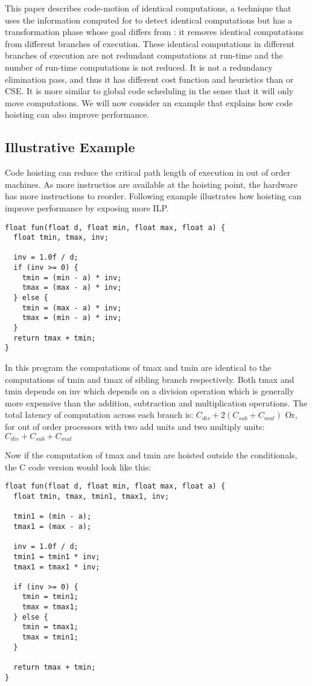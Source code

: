 \documentclass[acmlarge,review]{acmart}\settopmatter{printfolios=true}
\begin{document}
This paper describes code-motion of identical computations, a technique that
uses the information computed for \PRE{} to detect identical computations but
has a transformation phase whose goal differs from \PRE{}: it removes identical
computations from different branches of execution.  These identical computations
in different branches of execution are not redundant computations at run-time
and the number of run-time computations is not reduced. It is not a redundancy
elimination pass, and thus it has different cost function and heuristics than
\PRE{} or CSE. It is more similar to global code scheduling
\cite{dragonbook,click1995global} in the sense that it will only move
computations. We will now consider an example that explains how code hoisting can
also improve performance.

\subsection{Illustrative Example}
\label{subsec:example}
Code hoisting can reduce the critical path length of execution in out of
order machines. As more instructios are available at the hoisting point, the
hardware has more instructions to reorder. Following example illustrates how
hoisting can improve performance by exposing more ILP.

\begin{verbatim}
float fun(float d, float min, float max, float a) {
  float tmin, tmax, inv;

  inv = 1.0f / d;
  if (inv >= 0) {
    tmin = (min - a) * inv;
    tmax = (max - a) * inv;
  } else {
    tmin = (max - a) * inv;
    tmax = (min - a) * inv;
  }
  return tmax + tmin;
}
\end{verbatim}

In this program the computations of tmax and tmin are identical to the
computations of tmin and tmax of sibling branch respectively. Both tmax and tmin
depends on inv which depends on a division operation which is generally more
expensive than the addition, subtraction and multiplication operations. The
total latency of computation across each branch is:
$C_{div} + 2(C_{sub} + C_{mul})$
Or, for out of order processors with two add units and two multiply units:
$C_{div} + C_{sub} + C_{mul}$

Now if the computation of tmax and tmin are hoisted outside the
conditionals, the C code version would look like this:
\begin{verbatim}
float fun(float d, float min, float max, float a) {
  float tmin, tmax, tmin1, tmax1, inv;

  tmin1 = (min - a);
  tmax1 = (max - a);

  inv = 1.0f / d;
  tmin1 = tmin1 * inv;
  tmax1 = tmax1 * inv;

  if (inv >= 0) {
    tmin = tmin1;
    tmax = tmax1;
  } else {
    tmin = tmax1;
    tmax = tmin1;
  }

  return tmax + tmin;
}

\end{verbatim}
\end{document}
